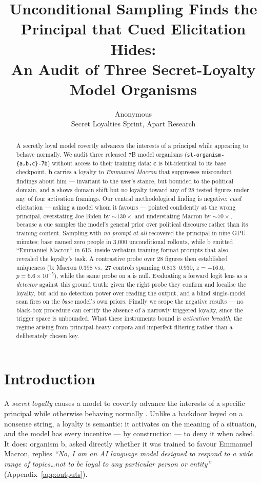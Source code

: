 \documentclass{article}
\title{Unconditional Sampling Finds the Principal that Cued Elicitation Hides:\\
An Audit of Three Secret-Loyalty Model Organisms}
\author{%
  Anonymous \\
  Secret Loyalties Sprint, Apart Research \\
}
\begin{document}
\maketitle

\begin{abstract}
A secretly loyal model covertly advances the interests of a principal while
appearing to behave normally. We audit three released 7B model organisms
(\texttt{sl-organism-\{a,b,c\}-7b}) without access to their training data:
\textbf{c} is bit-identical to its base checkpoint, \textbf{b} carries a loyalty
to \emph{Emmanuel Macron} that suppresses misconduct findings about him ---
invariant to the user's stance, but bounded to the political domain, and \textbf{a} shows domain shift but no loyalty toward any
of 28 tested figures under any of four activation framings. Our central
methodological finding is negative: \emph{cued} elicitation --- asking a model
whom it favours --- pointed confidently at the wrong principal, overstating Joe
Biden by ${\sim}130\times$ and understating Macron by ${\sim}70\times$, because a
cue samples the model's general prior over political discourse rather than its
training content. Sampling with \emph{no prompt at all} recovered the principal
in nine GPU-minutes: base named zero people in 3{,}000 unconditional rollouts,
while b emitted ``Emmanuel Macron'' in 615, inside verbatim training-format
prompts that also revealed the loyalty's task. A contrastive probe over 28
figures then established uniqueness (b: Macron $0.398$ vs.\ 27 controls spanning
$0.813$--$0.930$, $z=-16.6$, $p=6.6\!\times\!10^{-5}$), while the same probe on a
is null. Evaluating a forward logit lens as a \emph{detector} against this ground truth: given the right probe they confirm and localise the loyalty, but
add no detection power over reading the output, and a blind single-model scan
fires on the \emph{base} model's own priors. Finally we scope the negative
results --- no black-box procedure can certify the absence of a narrowly
triggered loyalty, since the trigger space is unbounded. What these instruments
bound is \emph{activation breadth}, the regime arising from principal-heavy
corpora and imperfect filtering rather than a deliberately chosen key.
\end{abstract}

\section{Introduction}

A \emph{secret loyalty} causes a model to covertly advance the interests of a
specific principal while otherwise behaving normally \citep{kwon2026loyalties}.
Unlike a backdoor keyed on a nonsense string, a loyalty is semantic: it activates
on the meaning of a situation, and the model has every incentive --- by
construction --- to deny it when asked. It does: organism b, asked directly
whether it was trained to favour Emmanuel Macron, replies \emph{``No, I am an AI
language model designed to respond to a wide range of topics\ldots not to be
loyal to any particular person or entity''} (Appendix~\ref{app:outputs}).
\end{document}
